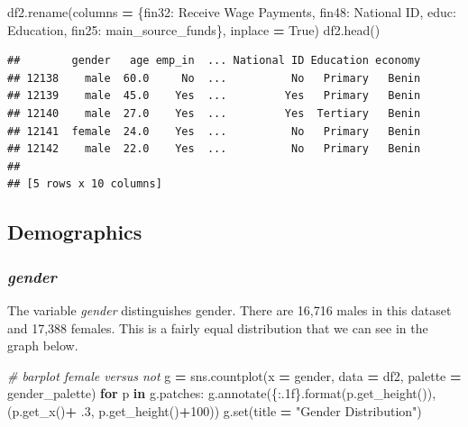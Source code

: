 \documentclass[water,article,submit,moreauthors,pdftex]{mdpi}
\newenvironment{Shaded}{\begin{snugshade}}{\end{snugshade}}
\newcommand{\BuiltInTok}[1]{#1}
\newcommand{\CommentTok}[1]{\textcolor[rgb]{0.56,0.35,0.01}{\textit{#1}}}
\newcommand{\ControlFlowTok}[1]{\textcolor[rgb]{0.13,0.29,0.53}{\textbf{#1}}}
\newcommand{\DecValTok}[1]{\textcolor[rgb]{0.00,0.00,0.81}{#1}}
\newcommand{\FloatTok}[1]{\textcolor[rgb]{0.00,0.00,0.81}{#1}}
\newcommand{\KeywordTok}[1]{\textcolor[rgb]{0.13,0.29,0.53}{\textbf{#1}}}
\newcommand{\NormalTok}[1]{#1}
\newcommand{\OperatorTok}[1]{\textcolor[rgb]{0.81,0.36,0.00}{\textbf{#1}}}
\newcommand{\SpecialCharTok}[1]{\textcolor[rgb]{0.00,0.00,0.00}{#1}}
\newcommand{\StringTok}[1]{\textcolor[rgb]{0.31,0.60,0.02}{#1}}
\newcommand{\VariableTok}[1]{\textcolor[rgb]{0.00,0.00,0.00}{#1}}
\begin{document}
\begin{Shaded}
\begin{Highlighting}[]
\NormalTok{df2.rename(columns }\OperatorTok{=}\NormalTok{ \{}\StringTok{\textquotesingle{}fin32\textquotesingle{}}\NormalTok{: }\StringTok{\textquotesingle{}Receive Wage Payments\textquotesingle{}}\NormalTok{, }\StringTok{\textquotesingle{}fin48\textquotesingle{}}\NormalTok{: }\StringTok{\textquotesingle{}National ID\textquotesingle{}}\NormalTok{, }\StringTok{\textquotesingle{}educ\textquotesingle{}}\NormalTok{: }\StringTok{\textquotesingle{}Education\textquotesingle{}}\NormalTok{, }\StringTok{\textquotesingle{}fin25\textquotesingle{}}\NormalTok{: }\StringTok{\textquotesingle{}main\_source\_funds\textquotesingle{}}\NormalTok{\}, inplace }\OperatorTok{=} \VariableTok{True}\NormalTok{)}
\NormalTok{df2.head()}
\end{Highlighting}
\end{Shaded}

\begin{verbatim}
##        gender   age emp_in  ... National ID Education economy
## 12138    male  60.0     No  ...          No   Primary   Benin
## 12139    male  45.0    Yes  ...         Yes   Primary   Benin
## 12140    male  27.0    Yes  ...         Yes  Tertiary   Benin
## 12141  female  24.0    Yes  ...          No   Primary   Benin
## 12142    male  22.0    Yes  ...          No   Primary   Benin
## 
## [5 rows x 10 columns]
\end{verbatim}

\hypertarget{demographics}{%
\subsection{Demographics}\label{demographics}}

\hypertarget{gender}{%
\subsubsection{\texorpdfstring{\emph{gender}}{gender}}\label{gender}}

The variable \emph{gender} distinguishes gender. There are 16,716 males
in this dataset and 17,388 females. This is a fairly equal distribution
that we can see in the graph below.

\begin{Shaded}
\begin{Highlighting}[]
\CommentTok{\# barplot female versus not}
\NormalTok{g }\OperatorTok{=}\NormalTok{ sns.countplot(x }\OperatorTok{=} \StringTok{\textquotesingle{}gender\textquotesingle{}}\NormalTok{, data }\OperatorTok{=}\NormalTok{ df2, palette }\OperatorTok{=}\NormalTok{ gender\_palette)}
\ControlFlowTok{for}\NormalTok{ p }\KeywordTok{in}\NormalTok{ g.patches:}
\NormalTok{   g.annotate(}\StringTok{\textquotesingle{}}\SpecialCharTok{\{:.1f\}}\StringTok{\textquotesingle{}}\NormalTok{.}\BuiltInTok{format}\NormalTok{(p.get\_height()), (p.get\_x()}\OperatorTok{+} \FloatTok{.3}\NormalTok{, p.get\_height()}\OperatorTok{+}\DecValTok{100}\NormalTok{))}
\NormalTok{g.}\BuiltInTok{set}\NormalTok{(title }\OperatorTok{=} \StringTok{"Gender Distribution"}\NormalTok{)}
\end{Highlighting}
\end{Shaded}
\end{document}
